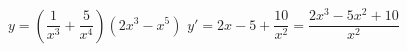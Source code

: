 {$y=\left(\dfrac1{x^3}+\dfrac5{x^4}\right)(2x^3 - x^5)$}
{$y'=2x-5+\dfrac{10}{x^2}=\dfrac{2x^3 - 5x^2+10}{x^2}$}

